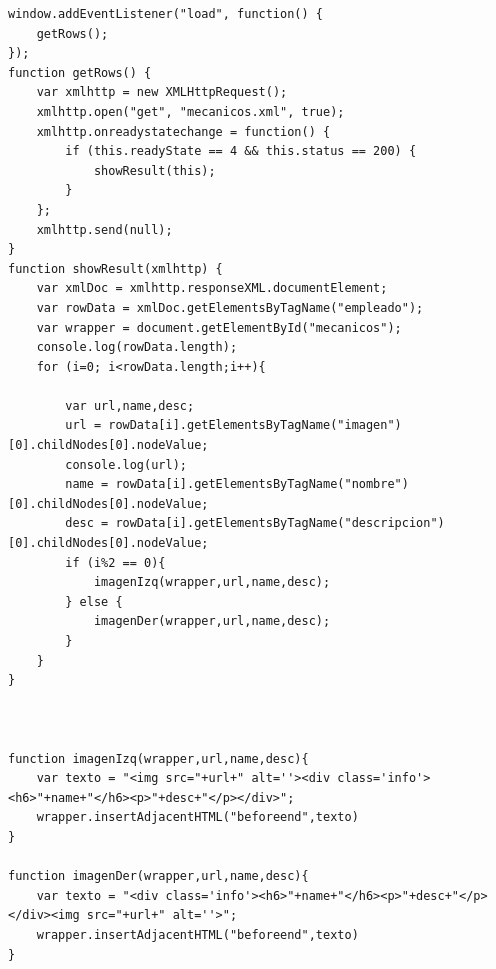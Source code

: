 \documentclass{article}
\begin{document}
{
  \begin{lstlisting}[caption=mecanicos.js]
window.addEventListener("load", function() {
	getRows();
});
function getRows() {
	var xmlhttp = new XMLHttpRequest();
	xmlhttp.open("get", "mecanicos.xml", true);
	xmlhttp.onreadystatechange = function() {
		if (this.readyState == 4 && this.status == 200) {
			showResult(this);
		}
	};
	xmlhttp.send(null);
}
function showResult(xmlhttp) {
    var xmlDoc = xmlhttp.responseXML.documentElement;
    var rowData = xmlDoc.getElementsByTagName("empleado");
    var wrapper = document.getElementById("mecanicos");
    console.log(rowData.length);
    for (i=0; i<rowData.length;i++){
        
        var url,name,desc;
        url = rowData[i].getElementsByTagName("imagen")[0].childNodes[0].nodeValue;
        console.log(url);
        name = rowData[i].getElementsByTagName("nombre")[0].childNodes[0].nodeValue;
        desc = rowData[i].getElementsByTagName("descripcion")[0].childNodes[0].nodeValue;
        if (i%2 == 0){
            imagenIzq(wrapper,url,name,desc);
        } else {
            imagenDer(wrapper,url,name,desc);
        }
    }
}



function imagenIzq(wrapper,url,name,desc){
    var texto = "<img src="+url+" alt=''><div class='info'><h6>"+name+"</h6><p>"+desc+"</p></div>";
    wrapper.insertAdjacentHTML("beforeend",texto)
}

function imagenDer(wrapper,url,name,desc){
    var texto = "<div class='info'><h6>"+name+"</h6><p>"+desc+"</p></div><img src="+url+" alt=''>";
    wrapper.insertAdjacentHTML("beforeend",texto)
}

  \end{lstlisting}
}
\end{document}

